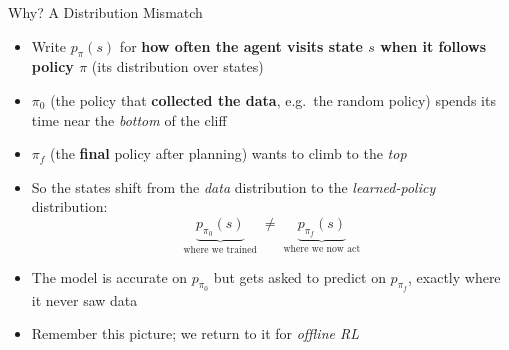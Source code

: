 \begin{frame}{Why? A Distribution Mismatch}
\begin{itemize}
    \item Write $p_\pi(s)$ for \textbf{how often the agent visits state $s$ when
          it follows policy $\pi$} (its distribution over states)
    \item $\pi_0$ (the policy that \textbf{collected the data}, e.g.\ the random
          policy) spends its time near the \emph{bottom} of the cliff
    \item $\pi_f$ (the \textbf{final} policy after planning) wants to climb to the
          \emph{top}
    \item So the states shift from the \emph{data} distribution to the
          \emph{learned-policy} distribution:
    \[ \underbrace{p_{\pi_0}(s)}_{\text{where we trained}} \;\neq\;
       \underbrace{p_{\pi_f}(s)}_{\text{where we now act}} \]
    \item The model is accurate on $p_{\pi_0}$ but gets asked to predict on
          $p_{\pi_f}$, exactly where it never saw data
    \item Remember this picture; we return to it for \emph{offline RL}
\end{itemize}
\end{frame}
